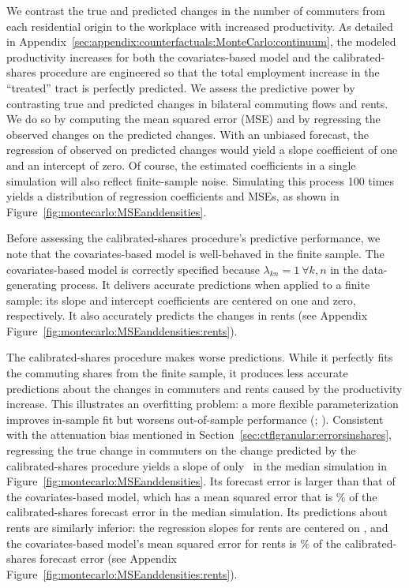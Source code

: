 \documentclass[11pt]{article}
\theoremstyle{definition}
\begin{document}
We contrast the true and predicted changes in the number of commuters from each residential origin 
to the workplace with increased productivity.
As detailed in Appendix~\ref{sec:appendix:counterfactuals:MonteCarlo:continuum},
the modeled productivity increases for both the covariates-based model and the calibrated-shares procedure are engineered so that the total employment increase in the ``treated'' tract is perfectly predicted.
We assess the predictive power by contrasting true and predicted changes in bilateral commuting flows and rents.
We do so by computing the mean squared error (MSE) and by regressing the observed changes on the predicted changes.
With an unbiased forecast, the regression of observed on predicted changes would yield a slope coefficient of one and an intercept of zero.
Of course, the estimated coefficients in a single simulation will also reflect finite-sample noise.
Simulating this process 100 times yields a distribution of regression coefficients and MSEs, as shown in Figure~\ref{fig:montecarlo:MSEanddensities}.

Before assessing the calibrated-shares procedure's predictive performance,
we note that the covariates-based model is well-behaved in the finite sample.
The covariates-based model
is correctly specified because $\lambda_{kn} = 1 \ \forall k,n$ in the data-generating process.
It delivers accurate predictions when applied to a finite sample:
its slope and intercept coefficients are centered on one and zero, respectively.
It also accurately predicts the changes in rents (see Appendix Figure~\ref{fig:montecarlo:MSEanddensities:rents}).

The calibrated-shares procedure makes worse predictions.
While it perfectly fits the commuting shares from the finite sample,
it produces less accurate predictions about the changes in commuters and rents caused by the productivity increase.
This illustrates an overfitting problem: a more flexible parameterization improves in-sample fit but worsens out-of-sample performance 
(\citealt[p. 221]{HastieTibshiraniFriedman:2009}; \citealt[p. 30]{BelloniChernozhukovHansen:2014}).
Consistent with the attenuation bias mentioned in Section~\ref{sec:ctflgranular:errorsinshares},
regressing the true change in commuters on the change predicted by the calibrated-shares procedure yields
a slope of only \unskip\ 
in the median simulation in Figure~\ref{fig:montecarlo:MSEanddensities}.
Its forecast error is larger than that of the covariates-based model,
which has a mean squared error that is \unskip\%
of the calibrated-shares forecast error in the median simulation.
Its predictions about rents are similarly inferior:
the regression slopes for rents are centered on \unskip,
and
the covariates-based model's mean squared error for rents is \unskip\%
of the calibrated-shares forecast error
(see Appendix Figure~\ref{fig:montecarlo:MSEanddensities:rents}).
\end{document}
